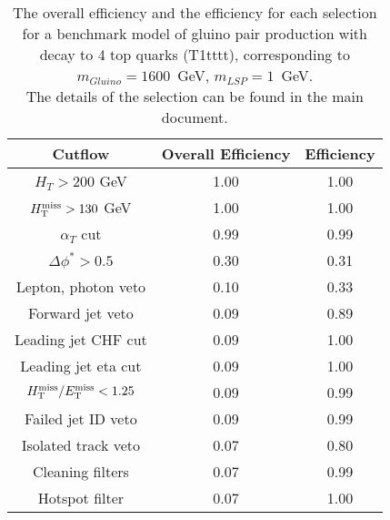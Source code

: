 \begin{longtable}{| c | c | c  | }
\caption{The overall efficiency and the efficiency for each selection for a benchmark model 
  of gluino pair production with decay to 4 top quarks
  (T1tttt), corresponding to $m_{Gluino} = 1600 $~GeV, $m_{LSP} = 1$~GeV. \\
  The details of the selection can be found in the main document. \label{tab:T1tttt_1600_1}} \\    \hline 
\textbf{Cutflow} & \textbf{Overall Efficiency} & \textbf{Efficiency}\\ \hline 
$H_{T} > 200$ GeV & 1.00 & 1.00\\ \hline 
$H_{\rm T}^{\rm miss} > 130$ GeV & 1.00 & 1.00\\ \hline 
$\alpha_{T}$ cut & 0.99 & 0.99\\ \hline 
$\Delta\phi^{*} > 0.5$ & 0.30 & 0.31\\ \hline 
Lepton, photon veto & 0.10 & 0.33\\ \hline 
Forward jet veto & 0.09 & 0.89\\ \hline 
Leading jet CHF cut & 0.09 & 1.00\\ \hline 
Leading jet eta cut & 0.09 & 1.00\\ \hline 
$H_{\rm T}^{\rm miss} / E_{\rm T}^{\rm miss} < 1.25$ & 0.09 & 0.99\\ \hline 
Failed jet ID veto & 0.09 & 0.99\\ \hline 
Isolated track veto & 0.07 & 0.80\\ \hline 
Cleaning filters & 0.07 & 0.99\\ \hline 
Hotspot filter & 0.07 & 1.00\\ \hline 
    \hline 
    \hline 
\end{longtable}
